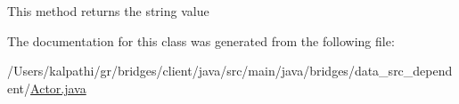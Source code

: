 This method returns the string value 

The documentation for this class was generated from the following file\+:\begin{DoxyCompactItemize}
\item 
/\+Users/kalpathi/gr/bridges/client/java/src/main/java/bridges/data\+\_\+src\+\_\+dependent/\mbox{\hyperlink{_actor_8java}{Actor.\+java}}\end{DoxyCompactItemize}
